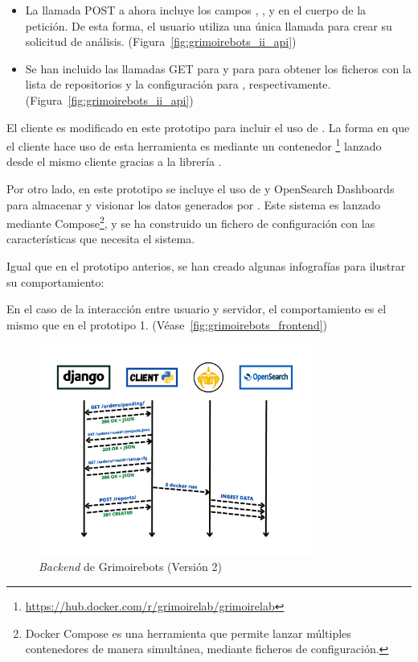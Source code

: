 \begin{itemize}
    \item La llamada POST a  ahora incluye los campos , , y  en el cuerpo de la petición. De esta forma, el usuario utiliza una única llamada para crear su solicitud de análisis. (Figura~\ref{fig:grimoirebots_ii_api})
    \item Se han incluido las llamadas GET para  y para  para obtener los ficheros con la lista de repositorios y la configuración para , respectivamente. (Figura~\ref{fig:grimoirebots_ii_api})
\end{itemize}

El cliente es modificado en este prototipo para incluir el uso de . La forma en que el cliente hace uso de esta herramienta es mediante un contenedor \footnote{\url{https://hub.docker.com/r/grimoirelab/grimoirelab}} lanzado desde el mismo cliente gracias a la librería .

Por otro lado, en este prototipo se incluye el uso de  y OpenSearch Dashboards para almacenar y visionar los datos generados por . Este sistema es lanzado mediante  Compose\footnote{Docker Compose es una herramienta que permite lanzar múltiples contenedores de manera simultánea, mediante ficheros de configuración.}, y se ha construido un fichero de configuración con las características que necesita el sistema.

Igual que en el prototipo anterios, se han creado algunas infografías para ilustrar su comportamiento:

En el caso de la interacción entre usuario y servidor, el comportamiento es el mismo que en el prototipo 1. (Véase~\ref{fig:grimoirebots_frontend})

\begin{figure}[ht]
    \centering
    \includegraphics[width=0.8\textwidth]{Figures/grimoirebots_ii_backend}
    \decoRule
    \caption[Grimoirebots II (\emph{Backend})]{\emph{Backend} de Grimoirebots (Versión 2)}
    \label{fig:grimoirebots_ii_backend}
\end{figure}

